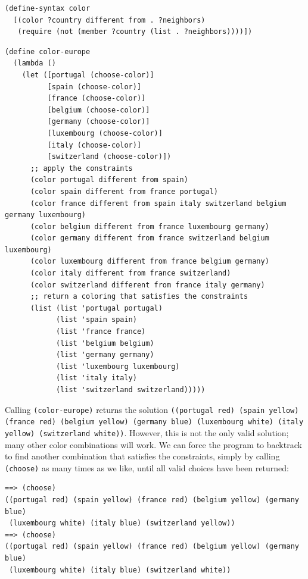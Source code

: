 \documentclass[acmsmall,screen,authorversion]{acmart}
\begin{document}
{\small
\begin{verbatim}
(define-syntax color
  [(color ?country different from . ?neighbors)
   (require (not (member ?country (list . ?neighbors))))])
\end{verbatim}
}

\noindent
\begin{minipage}{\textwidth}
{\small
\begin{verbatim}
(define color-europe
  (lambda ()
    (let ([portugal (choose-color)]
          [spain (choose-color)]
          [france (choose-color)]
          [belgium (choose-color)]
          [germany (choose-color)]
          [luxembourg (choose-color)]
          [italy (choose-color)]
          [switzerland (choose-color)])
      ;; apply the constraints
      (color portugal different from spain)
      (color spain different from france portugal)
      (color france different from spain italy switzerland belgium germany luxembourg)
      (color belgium different from france luxembourg germany)
      (color germany different from france switzerland belgium luxembourg)
      (color luxembourg different from france belgium germany)
      (color italy different from france switzerland)
      (color switzerland different from france italy germany)
      ;; return a coloring that satisfies the constraints
      (list (list 'portugal portugal)
            (list 'spain spain)
            (list 'france france)
            (list 'belgium belgium)
            (list 'germany germany)
            (list 'luxembourg luxembourg)
            (list 'italy italy)
            (list 'switzerland switzerland)))))

\end{verbatim}
}
\end{minipage}

\noindent
Calling \texttt{(color-europe)} returns the solution \texttt{((portugal red)
  (spain yellow) (france red) (belgium yellow) (germany blue) (luxembourg
  white) (italy yellow) (switzerland white))}. However, this is not the only
valid solution; many other color combinations will work.  We can force the
program to backtrack to find another combination that satisfies the
constraints, simply by calling \texttt{(choose)} as many times as we like,
until all valid choices have been returned:

{\small
\begin{verbatim}
==> (choose)
((portugal red) (spain yellow) (france red) (belgium yellow) (germany blue)
 (luxembourg white) (italy blue) (switzerland yellow))
==> (choose)
((portugal red) (spain yellow) (france red) (belgium yellow) (germany blue)
 (luxembourg white) (italy blue) (switzerland white))
\end{verbatim}
}
\end{document}
